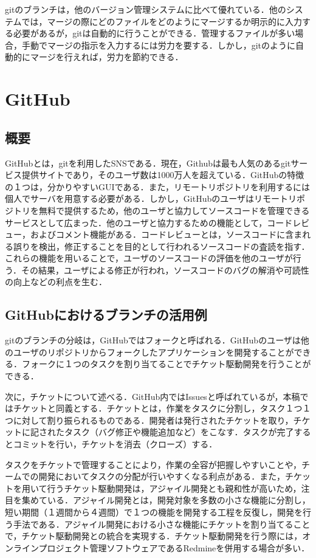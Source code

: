 \documentclass[a4j,9pt,twocolumn]{jsarticle}
\begin{document}
gitのブランチは，他のバージョン管理システムに比べて優れている．他のシステムでは，マージの際にどのファイルをどのようにマージするか明示的に入力する必要があるが，gitは自動的に行うことができる．管理するファイルが多い場合，手動でマージの指示を入力するには労力を要する．しかし，gitのように自動的にマージを行えれば，労力を節約できる．

\section{GitHub}
\subsection{概要}
GitHubとは，gitを利用したSNSである．現在，Githubは最も人気のあるgitサービス提供サイトであり，そのユーザ数は1000万人を超えている\cite{github}．GitHubの特徴の１つは，分かりやすいGUIである．また，リモートリポジトリを利用するには個人でサーバを用意する必要がある．しかし，GitHubのユーザはリモートリポジトリを無料で提供するため，他のユーザと協力してソースコードを管理できるサービスとして広まった．他のユーザと協力するための機能として，コードレビュー，およびコメント機能がある．コードレビューとは，ソースコードに含まれる誤りを検出，修正することを目的として行われるソースコードの査読を指す．これらの機能を用いることで，ユーザのソースコードの評価を他のユーザが行う．その結果，ユーザによる修正が行われ，ソースコードのバグの解消や可読性の向上などの利点を生む．

\subsection{GitHubにおけるブランチの活用例}
gitのブランチの分岐は，GitHubではフォークと呼ばれる．GitHubのユーザは他のユーザのリポジトリからフォークしたアプリケーションを開発することができる．フォークに１つのタスクを割り当てることでチケット駆動開発を行うことができる．

次に，チケットについて述べる．GitHub内ではIssuesと呼ばれているが，本稿ではチケットと同義とする．チケットとは，作業をタスクに分割し，タスク１つ１つに対して割り振られるものである．開発者は発行されたチケットを取り，チケットに記されたタスク（バグ修正や機能追加など）をこなす．タスクが完了するとコミットを行い，チケットを消去（クローズ）する．

タスクをチケットで管理することにより，作業の全容が把握しやすいことや，チームでの開発においてタスクの分配が行いやすくなる利点がある．また，チケットを用いて行うチケット駆動開発は，アジャイル開発とも親和性が高いため，注目を集めている．アジャイル開発とは，開発対象を多数の小さな機能に分割し，短い期間（１週間から４週間）で１つの機能を開発する工程を反復し，開発を行う手法である．アジャイル開発における小さな機能にチケットを割り当てることで，チケット駆動開発との統合を実現する．チケット駆動開発を行う際には，オンラインプロジェクト管理ソフトウェアであるRedmineを併用する場合が多い．
\end{document}
